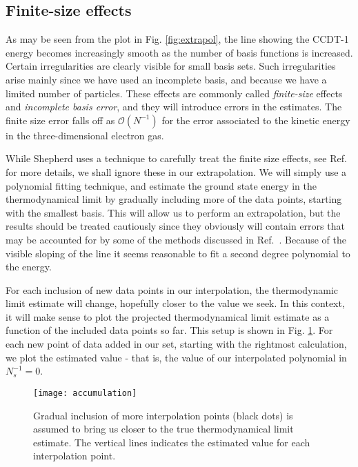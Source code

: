 \subsection{Finite-size effects}

As may be seen from the plot in Fig. \ref{fig:extrapol}, the line
showing the CCDT-1 energy becomes increasingly smooth as the number of
basis functions is increased. Certain irregularities are clearly
visible for small basis sets. Such irregularities arise mainly since
we have used an incomplete basis, and because we have a limited number
of particles. These effects are commonly called \emph{finite-size}
effects and \emph{incomplete basis error}, and they will introduce
errors in the estimates. The finite size error falls off as
$\mathcal{O}(N^{-1})$ for the error associated to the kinetic energy
in the three-dimensional electron gas. \cite{DrummondNotes}

While Shepherd uses a technique to carefully treat the finite size
effects, see Ref.~\cite{Shepherd2013} for more details, we shall ignore these in our
extrapolation. We will simply use a polynomial fitting technique, and
estimate the ground state energy in the thermodynamical limit by
gradually including more of the data points, starting with the
smallest basis. This will allow us to perform an extrapolation, but
the results should be treated cautiously since they obviously will
contain errors that may be accounted for by some of the methods
discussed in Ref.~\cite{DrummondNotes}. Because of the visible sloping
of the line it seems reasonable to fit a second degree polynomial to
the energy.

For each inclusion of new data points in our interpolation, the
thermodynamic limit estimate will change, hopefully closer to the
value we seek. In this context, it will make sense to plot the
projected thermodynamical limit estimate as a function of the included
data points so far. This setup is shown in
Fig. \ref{fig:accumulation}. For each new point of data added in our
set, starting with the rightmost calculation, we plot the estimated
value - that is, the value of our interpolated polynomial in $N_s^{-1}= 0$.

\begin{figure}[hbtp]
    \centering
    \texttt{[image: accumulation]}
    \caption{Gradual inclusion of more interpolation points (black dots) is assumed to bring us closer to the true thermodynamical limit estimate. The vertical lines indicates the estimated value for each interpolation point. }
    \label{fig:accumulation}
\end{figure}

